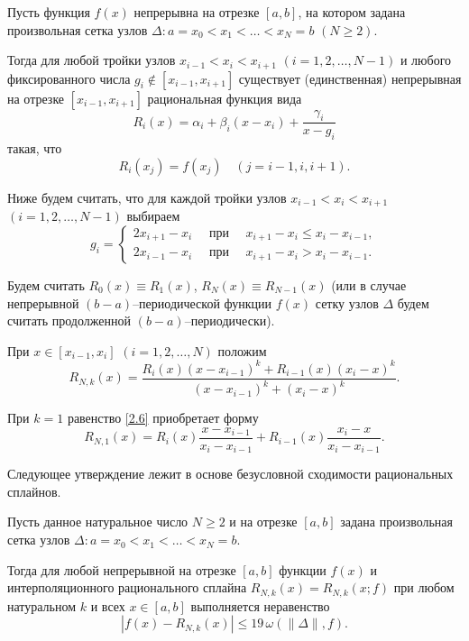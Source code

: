 Пусть функция $f(x)$ непрерывна на отрезке $[a,b]$, на котором задана произвольная сетка узлов
$\Delta: a=x_0<x_1<\dots<x_N=b$ $(N\geqslant 2)$.

Тогда для любой тройки узлов $x_{i-1}<x_i<x_{i+1}$
$(i=1,2,\dots,{N-1})$ и любого фиксированного числа $g_i\not \in [x_{i-1}, x_{i+1}]$
существует (единственная) непрерывная на отрезке $[x_{i-1}, x_{i+1}]$
рациональная функция вида
\begin{equation}\label{2.1}
R_i (x)=\alpha_i+\beta_i(x-x_i)+\frac{\gamma_i}{x-g_i}
\end{equation}
такая, что
$$
R_i(x_j)=f(x_j)\quad (j=i-1,i,i+1).
$$

Ниже будем считать, что для каждой тройки узлов $x_{i-1}< x_i< x_{i+1}$
${(i=1,2,\dots,N-1)}$ выбираем
\begin{equation}\label{2.3}
g_i=\begin{cases}
2x_{i+1}-x_i \quad\text{ при }\quad x_{i+1}-x_i\leqslant x_i-x_{i-1},\\
2x_{i-1}-x_i \quad \text{ при }\quad x_{i+1}-x_i> x_i-x_{i-1}.
\end{cases}
\end{equation}


Будем считать $R_0(x)\equiv R_1(x)$, $R_N (x)\equiv R_{N-1}(x)$
(или в случае непрерывной $(b-a)$--периодической функции $f(x)$ сетку узлов $\Delta$
будем считать продолженной $(b-a)$--периодически).

При $x\in [x_{i-1}, x_i]$ $(i=1,2,\dots,N)$ положим
\begin{equation}\label{2.6}
R_{N, k}(x)=\frac{R_i(x) (x-x_{i-1})^k+R_{i-1} (x) (x_i-x)^k}
{(x-x_{i-1})^k+(x_i-x)^k}.
\end{equation}


При $k=1$ равенство \eqref{2.6} приобретает форму
$$
R_{N,1} (x)=R_i (x) \frac{x-x_{i-1}}{x_i-x_{i-1}}+R_{i-1} (x)\frac{x_i-x}{x_i-x_{i-1}}.
$$

Следующее утверждение лежит в основе безусловной сходимости рациональных сплайнов.


\begin{theorem}\label{teor2.1}
 Пусть данное натуральное число $N\geqslant 2$ и на отрезке
$[a,b]$ задана произвольная сетка узлов $\Delta: a=x_0<x_1<\dots<x_N=b$.

Тогда для любой непрерывной на отрезке $[a,b]$ функции $f(x)$ и интерполяционного
рационального сплайна $R_{N,k} (x)=R_{N,k}(x;f)$
при любом натуральном $k$ и всех $x\in [a,b]$ выполняется неравенство
$$
|f(x)-R_{N,k}(x)|\leqslant 19\,\omega (\|\Delta\|,f).
$$
 \end{theorem}


